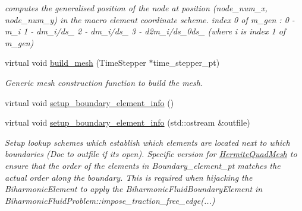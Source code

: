 \begin{DoxyCompactItemize}
\begin{DoxyCompactList}\small\item\em computes the generalised position of the node at position (node\+\_\+num\+\_\+x, node\+\_\+num\+\_\+y) in the macro element coordinate scheme. index 0 of m\+\_\+gen \+: 0 -\/ m\+\_\+i 1 -\/ dm\+\_\+i/ds\+\_ 2 -\/ dm\+\_\+i/ds\+\_ 3 -\/ d2m\+\_\+i/ds\+\_\+0ds\+\_ (where i is index 1 of m\+\_\+gen) \end{DoxyCompactList}\item 
virtual void \hyperlink{classoomph_1_1HermiteQuadMesh_af72fd9b700fdee643ce6d6259c0e8e6f}{build\+\_\+mesh} (Time\+Stepper $\ast$time\+\_\+stepper\+\_\+pt)
\begin{DoxyCompactList}\small\item\em Generic mesh construction function to build the mesh. \end{DoxyCompactList}\item 
virtual void \hyperlink{classoomph_1_1HermiteQuadMesh_a6eefe872b5bf8a06174b536d9727ea44}{setup\+\_\+boundary\+\_\+element\+\_\+info} ()
\item 
virtual void \hyperlink{classoomph_1_1HermiteQuadMesh_a0e4cd3df0828e87a762c61b09121e1c0}{setup\+\_\+boundary\+\_\+element\+\_\+info} (std\+::ostream \&outfile)
\begin{DoxyCompactList}\small\item\em Setup lookup schemes which establish which elements are located next to which boundaries (Doc to outfile if it\textquotesingle{}s open). Specific version for \hyperlink{classoomph_1_1HermiteQuadMesh}{Hermite\+Quad\+Mesh} to ensure that the order of the elements in Boundary\+\_\+element\+\_\+pt matches the actual order along the boundary. This is required when hijacking the Biharmonic\+Element to apply the Biharmonic\+Fluid\+Boundary\+Element in Biharmonic\+Fluid\+Problem\+::impose\+\_\+traction\+\_\+free\+\_\+edge(...) \end{DoxyCompactList}\end{DoxyCompactItemize}
